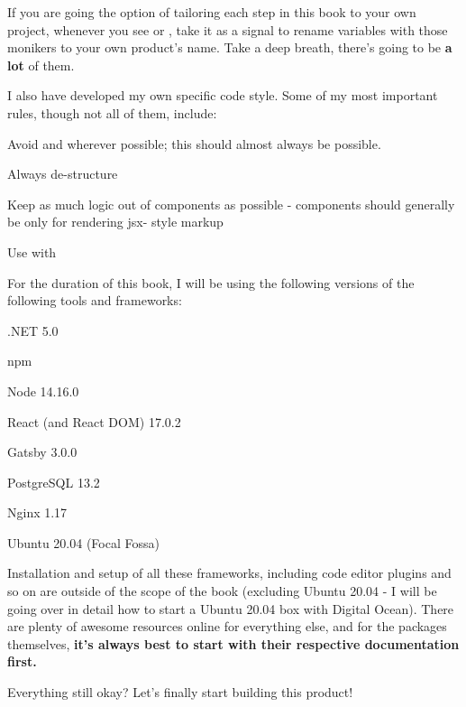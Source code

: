\documentclass[a4paper,
                             oneside,
                             BCOR1.0cm,
                             DIV11,
                             parskip=full,
                             11pt]{scrbook}
\begin{document}
If you are going the option of tailoring each step in this book to your own project, whenever you see  or , take it as a signal to rename variables with those monikers to your own product's name. Take a deep breath, there's going to be \textbf{a lot} of them.


I also have developed my own specific code style. Some of my most important rules, though not all of them, include:

\begin{arrows}
\item Avoid  and  wherever possible; this should almost always be possible.
\item Always de-structure 
\item Keep as much logic out of components as possible - components should generally be only for rendering jsx- style markup
\item Use  with 
\end{arrows}


For the duration of this book, I will be using the following versions of the following tools and frameworks:

\begin{arrows}
\item .NET 5.0
\item npm 
\item Node 14.16.0
\item React (and React DOM) 17.0.2
\item Gatsby 3.0.0
\item PostgreSQL 13.2
\item Nginx 1.17
\item Ubuntu 20.04 (Focal Fossa)
\end{arrows}

Installation and setup of all these frameworks, including code editor plugins and so on are outside of the scope of the book (excluding Ubuntu 20.04 - I will be going over in detail how to start a Ubuntu 20.04 box with Digital Ocean). There are plenty of awesome resources online for everything else, and for the packages themselves, \textbf{it's always best to start with their respective documentation first.}

Everything still okay? Let's finally start building this product!
\end{document}
